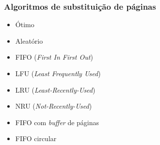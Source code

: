 \documentclass[aspectratio=169,
				xcolor=table]{beamer}
\begin{document}
	\begin{frame}
		\frametitle{Algoritmos de substituição de páginas}
		
		\begin{itemize}
			\item Ótimo 
			\item Aleatório
			\item FIFO (\textit{First In First Out})
			\item LFU (\textit{Least Frequently Used})
			\item LRU (\textit{Least-Recently-Used})
			\item NRU (\textit{Not-Recently-Used})
			\item FIFO com \textit{buffer} de páginas
			\item FIFO circular


		\end{itemize}
	\end{frame}
\end{document}
